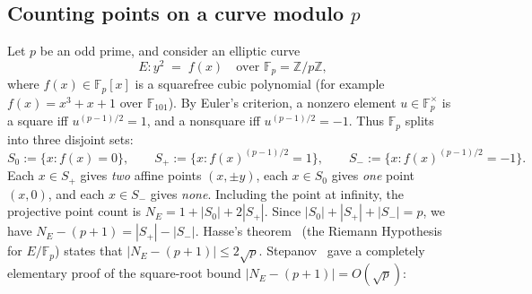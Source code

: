 \documentclass[11pt]{amsart}
\newcommand{\ZZ}{\mathbb{Z}}
\newcommand{\FF}{\mathbb{F}}
\theoremstyle{definition}
\theoremstyle{remark}
\begin{document}
\subsection{Counting points on a curve modulo \texorpdfstring{$p$}{p}}
Let $p$ be an odd prime, and consider an elliptic curve
\[
 E\colon y^2 \;=\; f(x) \quad\text{over } \FF_p=\ZZ/p\ZZ,
\]
where $f(x)\in\FF_p[x]$ is a squarefree cubic polynomial (for example $f(x)=x^3+x+1$ over $\FF_{101}$). By Euler's criterion, a nonzero element $u\in\FF_p^\times$ is a square iff $u^{(p-1)/2}=1$, and a nonsquare iff $u^{(p-1)/2}=-1$. Thus $\FF_p$ splits into three disjoint sets:
\[
 S_0:=\{x:f(x)=0\},\qquad
 S_+:=\{x:f(x)^{(p-1)/2}=1\},\qquad
 S_-:=\{x:f(x)^{(p-1)/2}=-1\}.
\]
Each $x\in S_+$ gives \emph{two} affine points $(x,\pm y)$, each $x\in S_0$ gives \emph{one} point $(x,0)$, and each $x\in S_-$ gives \emph{none}. Including the point at infinity, the projective point count is $N_E=1+|S_0|+2|S_+|$. Since $|S_0|+|S_+|+|S_-|=p$, we have $N_E-(p+1)=|S_+|-|S_-|$. Hasse's theorem~\cite{Hasse} (the Riemann Hypothesis for $E/\FF_p$) states that $|N_E-(p+1)|\le 2\sqrt{p}$. Stepanov~\cite{Stepanov,BombieriStep} gave a completely elementary proof of the square-root bound $|N_E-(p+1)|=O(\sqrt{p})$:
\end{document}
